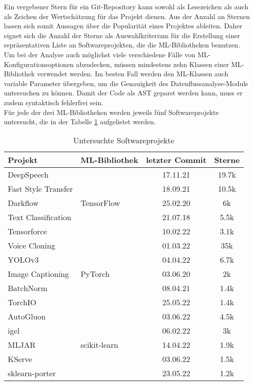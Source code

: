 \documentclass[german,bachelor]{swsLeipzig}
\begin{document}
\noindent Ein vergebener Stern für ein Git-Repository kann sowohl als Lesezeichen als auch als Zeichen der Wertschätzung für das Projekt dienen.
Aus der Anzahl an Sternen lassen sich somit Aussagen über die Popularität eines Projektes ableiten.
Daher eignet sich die Anzahl der Sterne als Auswahlkriterium für die Erstellung einer repräsentativen Liste an Softwareprojekten, die die
ML-Bibliotheken benutzen.
Um bei der Analyse auch möglichst viele verschiedene Fälle von ML-Konfigurationsoptionen abzudecken, müssen mindestens zehn
Klassen einer ML-Bibliothek verwendet werden.
Im besten Fall werden den ML-Klassen auch variable Parameter übergeben, um die Genauigkeit des Datenflussanalyse-Moduls
untersuchen zu können.
Damit der Code als AST geparst werden kann, muss er zudem syntaktisch fehlerfrei sein.\\
\indent Für jede der drei ML-Bibliotheken werden jeweils fünf Softwareprojekte untersucht, die in der Tabelle \ref{projekte} aufgelistet
werden.\\

\begin{table}[H]
\small
\begin{center}
\begin{tabular}[h]{l|l|c|c}
\hline
Projekt & ML-Bibliothek & letzter Commit & Sterne \\
\hline \hline
DeepSpeech & \multirow{5}{*}{TensorFlow} & 17.11.21 & 19.7k\\
Fast Style Transfer & & 18.09.21 & 10.5k \\
Darkflow & & 25.02.20 & 6k \\
Text Classification & & 21.07.18 & 5.5k \\
Tensorforce & & 10.02.22 & 3.1k \\
\hline
Voice Cloning & \multirow{5}{*}{PyTorch} & 01.03.22 & 35k\\
YOLOv3 & & 04.04.22 & 6.7k \\
Image Captioning & & 03.06.20 & 2k \\
BatchNorm & & 08.04.21 & 1.4k \\
TorchIO & & 25.05.22 & 1.4k \\
\hline
AutoGluon & \multirow{5}{*}{scikit-learn} & 03.06.22 & 4.5k\\
igel & & 06.02.22 & 3k \\
MLJAR & & 14.04.22 & 1.9k \\
KServe & & 03.06.22 & 1.5k \\
sklearn-porter & & 23.05.22 & 1.2k \\
\hline
\end{tabular}
\caption{Untersuchte Softwareprojekte} \label{projekte}
\end{center}
\end{table}
\end{document}

